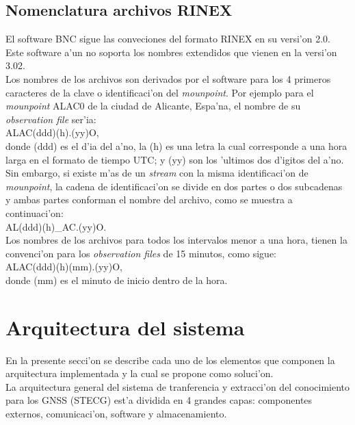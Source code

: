 \subsection{Nomenclatura archivos RINEX}
\noindent
El software BNC sigue las conveciones del formato RINEX en su versi'on 2.0. Este software a'un no soporta los nombres extendidos que vienen en la versi'on 3.02. \\

Los nombres de los archivos son derivados por el software para los 4 primeros caracteres de la clave o identificaci'on del \emph{mounpoint}. Por ejemplo para el \emph{mounpoint} ALAC0 de la ciudad de Alicante, Espa'na, el nombre de su \emph{observation file} ser'ia:\\

ALAC(ddd)(h).(yy)O,\\

donde (ddd) es el d'ia del a'no, la (h) es una letra la cual corresponde a una hora larga en el formato de tiempo UTC; y (yy) son los 'ultimos dos d'igitos del a'no.\\

Sin embargo, si existe m'as de un \emph{stream} con la misma identificaci'on de \emph{mounpoint}, la cadena de identificaci'on se divide en dos partes o dos subcadenas y ambas partes conforman el nombre del archivo, como se muestra a continuaci'on:\\

AL(ddd)(h)\_AC.(yy)O.\\

Los nombres de los archivos para todos los intervalos menor a una hora, tienen la convenci'on para los \emph{observation files} de 15 minutos, como sigue:\\

ALAC(ddd)(h)(mm).(yy)O,\\

donde (mm) es el minuto de inicio dentro de la hora.\\

\section{Arquitectura del sistema}
\noindent
En la presente secci'on se describe cada uno de los elementos que componen la arquitectura implementada y la cual se propone como soluci'on. \\

La arquitectura general del sistema de tranferencia y extracci'on del conocimiento para los GNSS (STECG) est'a dividida en 4 grandes capas: componentes externos, comunicaci'on, software y almacenamiento. 

